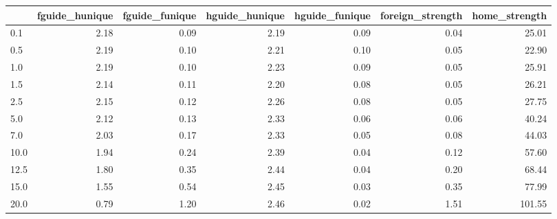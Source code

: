 \begin{tabular}{lrrrrrr}
\toprule
 & fguide_hunique & fguide_funique & hguide_hunique & hguide_funique & foreign_strength & home_strength \\
\midrule
0.1 & 2.18 & 0.09 & 2.19 & 0.09 & 0.04 & 25.01 \\
0.5 & 2.19 & 0.10 & 2.21 & 0.10 & 0.05 & 22.90 \\
1.0 & 2.19 & 0.10 & 2.23 & 0.09 & 0.05 & 25.91 \\
1.5 & 2.14 & 0.11 & 2.20 & 0.08 & 0.05 & 26.21 \\
2.5 & 2.15 & 0.12 & 2.26 & 0.08 & 0.05 & 27.75 \\
5.0 & 2.12 & 0.13 & 2.33 & 0.06 & 0.06 & 40.24 \\
7.0 & 2.03 & 0.17 & 2.33 & 0.05 & 0.08 & 44.03 \\
10.0 & 1.94 & 0.24 & 2.39 & 0.04 & 0.12 & 57.60 \\
12.5 & 1.80 & 0.35 & 2.44 & 0.04 & 0.20 & 68.44 \\
15.0 & 1.55 & 0.54 & 2.45 & 0.03 & 0.35 & 77.99 \\
20.0 & 0.79 & 1.20 & 2.46 & 0.02 & 1.51 & 101.55 \\
\bottomrule
\end{tabular}
